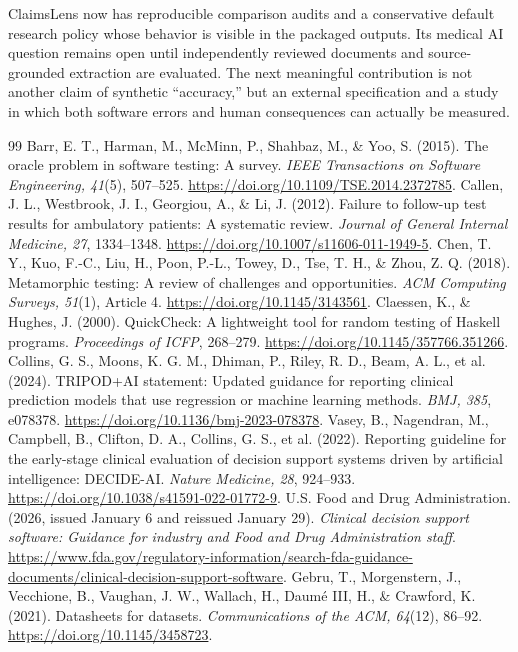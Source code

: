 \documentclass[11pt,twocolumn]{article}
\begin{document}
ClaimsLens now has reproducible comparison audits and a conservative default research policy whose behavior is visible in the packaged outputs. Its medical AI question remains open until independently reviewed documents and source-grounded extraction are evaluated. The next meaningful contribution is not another claim of synthetic ``accuracy,'' but an external specification and a study in which both software errors and human consequences can actually be measured.
\small
\begin{thebibliography}{99}
\setlength{\itemsep}{5pt}
 Barr, E. T., Harman, M., McMinn, P., Shahbaz, M., \& Yoo, S. (2015). The oracle problem in software testing: A survey. \emph{IEEE Transactions on Software Engineering, 41}(5), 507--525. \url{https://doi.org/10.1109/TSE.2014.2372785}.
 Callen, J. L., Westbrook, J. I., Georgiou, A., \& Li, J. (2012). Failure to follow-up test results for ambulatory patients: A systematic review. \emph{Journal of General Internal Medicine, 27}, 1334--1348. \url{https://doi.org/10.1007/s11606-011-1949-5}.
 Chen, T. Y., Kuo, F.-C., Liu, H., Poon, P.-L., Towey, D., Tse, T. H., \& Zhou, Z. Q. (2018). Metamorphic testing: A review of challenges and opportunities. \emph{ACM Computing Surveys, 51}(1), Article 4. \url{https://doi.org/10.1145/3143561}.
 Claessen, K., \& Hughes, J. (2000). QuickCheck: A lightweight tool for random testing of Haskell programs. \emph{Proceedings of ICFP}, 268--279. \url{https://doi.org/10.1145/357766.351266}.
 Collins, G. S., Moons, K. G. M., Dhiman, P., Riley, R. D., Beam, A. L., et al. (2024). TRIPOD+AI statement: Updated guidance for reporting clinical prediction models that use regression or machine learning methods. \emph{BMJ, 385}, e078378. \url{https://doi.org/10.1136/bmj-2023-078378}.
 Vasey, B., Nagendran, M., Campbell, B., Clifton, D. A., Collins, G. S., et al. (2022). Reporting guideline for the early-stage clinical evaluation of decision support systems driven by artificial intelligence: DECIDE-AI. \emph{Nature Medicine, 28}, 924--933. \url{https://doi.org/10.1038/s41591-022-01772-9}.
 U.S. Food and Drug Administration. (2026, issued January 6 and reissued January 29). \emph{Clinical decision support software: Guidance for industry and Food and Drug Administration staff}. \url{https://www.fda.gov/regulatory-information/search-fda-guidance-documents/clinical-decision-support-software}.
 Gebru, T., Morgenstern, J., Vecchione, B., Vaughan, J. W., Wallach, H., Daum\'e III, H., \& Crawford, K. (2021). Datasheets for datasets. \emph{Communications of the ACM, 64}(12), 86--92. \url{https://doi.org/10.1145/3458723}.

\end{thebibliography}
\end{document}
